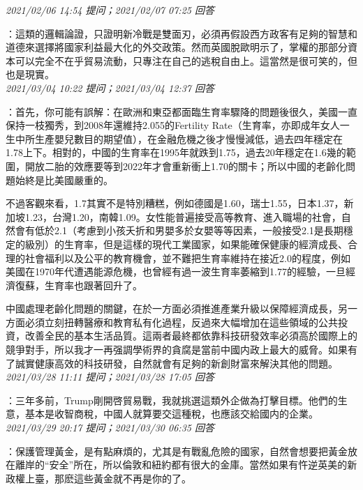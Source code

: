 \documentclass[twocolumn]{ctexart}
\begin{document}
\textit{\hfill\noindent\small 2021/02/06 14:54 提问；2021/02/07 07:25 回答}

：這類的邏輯論證，只證明新冷戰是雙面刃，必須再假設西方政客有足夠的智慧和道德來選擇將國家利益最大化的外交政策。然而英國脫歐明示了，掌權的那部分資本可以完全不在乎貿易流動，只專注在自己的逃稅自由上。這當然是很可笑的，但也是現實。
\\

\textit{\hfill\noindent\small 2021/03/04 10:22 提问；2021/03/04 12:37 回答}

：首先，你可能有誤解：在歐洲和東亞都面臨生育率驟降的問題後很久，美國一直保持一枝獨秀，到2008年還維持2.055的Fertility Rate（生育率，亦即成年女人一生中所生產嬰兒數目的期望值），在金融危機之後才慢慢減低，過去四年穩定在1.78上下。相對的，中國的生育率在1995年就跌到1.75，過去20年穩定在1.6幾的範圍，開放二胎的效應要等到2022年才會重新衝上1.70的關卡；所以中國的老齡化問題始終是比美國嚴重的。

不過客觀來看，1.7其實不是特別糟糕，例如德國是1.60，瑞士1.55，日本1.37，新加坡1.23，台灣1.20，南韓1.09。女性能普遍接受高等教育、進入職場的社會，自然會有低於2.1（考慮到小孩夭折和男嬰多於女嬰等等因素，一般接受2.1是長期穩定的級別）的生育率，但是這樣的現代工業國家，如果能確保健康的經濟成長、合理的社會福利以及公平的教育機會，並不難把生育率維持在接近2.0的程度，例如美國在1970年代遭遇能源危機，也曾經有過一波生育率萎縮到1.77的經驗，一旦經濟復蘇，生育率也跟著回升了。

中國處理老齡化問題的關鍵，在於一方面必須推進產業升級以保障經濟成長，另一方面必須立刻扭轉醫療和教育私有化過程，反過來大幅增加在這些領域的公共投資，改善全民的基本生活品質。這兩者最終都依靠科技研發效率必須高於國際上的競爭對手，所以我才一再强調學術界的貪腐是當前中國内政上最大的威脅。如果有了誠實健康高效的科技研發，自然就會有足夠的新創財富來解決其他的問題。
\\

\textit{\hfill\noindent\small 2021/03/28 11:11 提问；2021/03/28 17:05 回答}

：三年多前，Trump剛開啓貿易戰，我就挑選這類外企做為打擊目標。他們的生意，基本是收智商稅，中國人就算要交這種稅，也應該交給國内的企業。
\\

\textit{\hfill\noindent\small 2021/03/29 20:17 提问；2021/03/30 06:35 回答}

：保護管理黃金，是有點麻煩的，尤其是有戰亂危險的國家，自然會想要把黃金放在離岸的“安全”所在，所以倫敦和紐約都有很大的金庫。當然如果有忤逆英美的新政權上臺，那麽這些黃金就不再是你的了。
\end{document}
